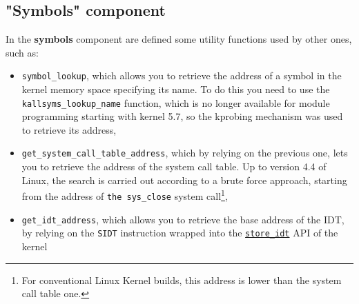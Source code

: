 \documentclass{article}
\begin{document}
	\subsection{"Symbols" component}\label{sec:symbols}
	In the \textbf{symbols} component are defined some utility functions used by other ones, such as:
	\begin{itemize}
		\item \texttt{symbol\_lookup}, which allows you to retrieve the address of a symbol in the kernel memory space
		specifying its name. To do this you need to use the \texttt{kallsyms\_lookup\_name} function, which is no
		longer available for module programming starting with kernel 5.7, so the kprobing mechanism was used to
		retrieve its address,
		\item \texttt{get\_system\_call\_table\_address}, which by relying on the previous one, lets you to retrieve
		the address of the system call table. Up to version 4.4 of Linux, the search is carried out according to a
		brute force approach, starting from the address of \texttt{the sys\_close} system call\footnote{For
			conventional Linux Kernel builds, this address is lower than the system call table one.},
		\item \texttt{get\_idt\_address}, which allows you to retrieve the base address of the IDT, by relying on the
		\texttt{SIDT} instruction wrapped into the
		\href{https://elixir.bootlin.com/linux/latest/source/arch/x86/include/asm/desc.h#L223}{\texttt{store\_idt}} API
		of the kernel
	\end{itemize}
\end{document}
